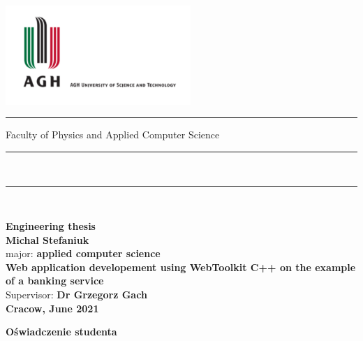 \documentclass[a4paper,12pt]{article}
\begin{document}
\thispagestyle{empty}
\includegraphics[height=37.5mm]{agh_nzw_a_en_1w_wbr_pms}\\
\rule{30mm}{0pt}{
{\large \textsf{Faculty of Physics and Applied Computer Science}}\\
\rule{\textwidth}{3pt}\\
\rule[2ex]
{\textwidth}{1pt}\\
\vspace{7ex}
\begin{center}
{\LARGE \bf \textsf{Engineering thesis}}\\
\vspace{13ex}
{\bf \Large \textsf{Michal Stefaniuk}}\\
\vspace{3ex}
{\small \sf major: {\bf \textsf{applied computer science}}}\\
\vspace{1.5ex}
\vspace{10ex}
{\bf \huge \textsf{Web application developement using WebToolkit
C++ on the example of a banking service}}\\
\vspace{14ex}
{\Large \sf Supervisor: {\bf \textsf{Dr Grzegorz Gach}}}\\
\vspace{22ex}
{\large \bf \textsf{Cracow, June 2021}}
\end{center}

\newpage

\begin{center}
	{\bf\large\textsf{Oświadczenie studenta}}\\
\end{center}

}
\end{document}
